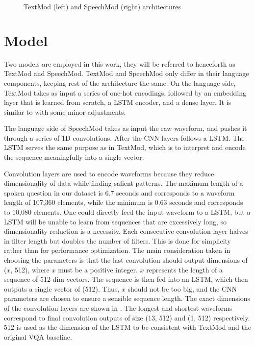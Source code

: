 \documentclass[letterpaper]{article} %
\begin{document}
\begin{figure}[t]
\caption{TextMod (left) and SpeechMod (right) architectures}
\label{fig:modarc}
\end{figure}

\section{Model}
\label{sec:method}
Two models are employed in this work, they will be referred to henceforth as TextMod and SpeechMod. TextMod and SpeechMod only differ in their language components, keeping rest of the architecture the same. On the language side, TextMod takes as input a series of one-hot encodings, followed by an embedding layer that is learned from scratch, a LSTM encoder, and a dense layer. It is similar to \cite{VQA} with some minor adjustments.

The language side of SpeechMod takes as input the raw waveform, and pushes it through a series of 1D convolutions. After the CNN layers follows a LSTM. The LSTM serves the same purpose as in TextMod, which is to interpret and encode the sequence meaningfully into a single vector.

Convolution layers are used to encode waveforms because they reduce dimensionality of data while finding salient patterns. The maximum length of a spoken question in our dataset is 6.7 seconds and corresponds to a waveform length of 107,360 elements, while the minimum is 0.63 seconds and corresponds to 10,080 elements. One could directly feed the input waveform to a LSTM, but a LSTM will be unable to learn from sequences that are excessively long, so dimensionality reduction is a necessity. Each consecutive convolution layer halves in filter length but doubles the number of filters. This is done for simplicity rather than for performance optimization. The main consideration taken in choosing the parameters is that the last convolution should output dimensions of ($x$, 512), where $x$ must be a positive integer. $x$ represents the length of a sequence of 512-dim vectors. The sequence is then fed into an LSTM, which then outputs a single vector of (512). Thus, $x$ should not be too big, and the CNN parameters are chosen to ensure a sensible sequence length. The exact dimensions of the convolution layers are shown in . The longest and shortest waveforms correspond to final convolution outputs of size (13, 512) and (1, 512) respectively. 512 is used as the dimension of the LSTM to be consistent with TextMod and the original VQA baseline.
\end{document}
